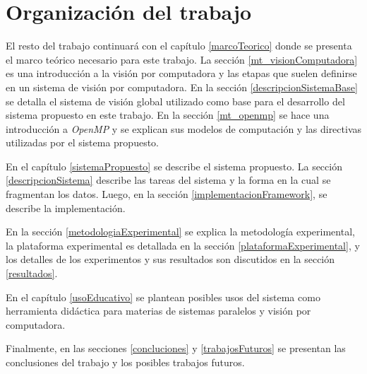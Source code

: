 
\section{Organización del trabajo}

El resto del trabajo continuará con el capítulo \ref{marcoTeorico} donde se
presenta el marco teórico necesario para este trabajo. La sección
\ref{mt_visionComputadora} es una introducción a la visión por computadora y las
etapas que suelen definirse en un sistema de visión por computadora. En la
sección \ref{descripcionSistemaBase} se detalla el sistema de visión global
utilizado como base para el desarrollo del sistema propuesto en este trabajo.
En la sección \ref{mt_openmp} se hace una introducción a \emph{OpenMP} y se
explican sus modelos de computación y las directivas utilizadas por el sistema
propuesto.

En el capítulo \ref{sistemaPropuesto} se describe el sistema propuesto. La
sección \ref{descripcionSistema} describe las tareas del sistema y la forma en
la cual se fragmentan los datos. Luego, en la sección
\ref{implementacionFramework}, se describe la implementación.

En la sección \ref{metodologiaExperimental} se explica la metodología
experimental, la plataforma experimental es detallada en la sección
\ref{plataformaExperimental}, y los detalles de los experimentos y sus
resultados son discutidos en la sección \ref{resultados}.

En el capítulo \ref{usoEducativo} se plantean posibles usos del sistema como
herramienta didáctica para materias de sistemas paralelos y visión por
computadora.

Finalmente, en las secciones \ref{concluciones} y \ref{trabajosFuturos} se
presentan las conclusiones del trabajo y los posibles trabajos futuros.
